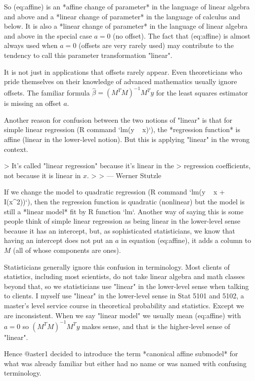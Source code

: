 \documentclass[11pt]{article}
\begin{document}
So \@ref(eq:affine) is an *affine change of parameter* in the language
of linear algebra and above and a *linear change of parameter* in the
language of calculus and below.  It is also a *linear change of parameter*
in the language of linear algebra and above in the special case $a = 0$
(no offset).  The fact that \@ref(eq:affine) is almost always used when $a = 0$
(offsets are very rarely used) may contribute to the tendency to
call this parameter transformation "linear".

It is not just in applications that offsets rarely appear.
Even theoreticians who pride themselves on their knowledge
of advanced mathematics usually ignore offsets.
The familiar formula $\hat{\beta} = (M^T M)^{- 1} M^T y$ for the
least squares estimator is missing an offset $a$.

Another reason for confusion between the two notions of "linear" is that
for simple linear regression (R command `lm(y ~ x)`), the *regression function*
is affine (linear in the lower-level notion).  But this is applying "linear"
in the wrong context.

> It's called "linear regression" because it's linear in the
> regression coefficients, not because it is linear in $x$.
>
> — Werner Stutzle

If we change the model to quadratic regression
(R command `lm(y ~ x + I(x^2))`), then the regression function is quadratic
(nonlinear) but the model is still a *linear model* fit by R function `lm`.
Another way of saying this is some people think of simple linear regression
as being linear in the lower-level sense because it has an intercept,
but, as sophisticated statisticians, we know that having an intercept
does not put an $a$ in equation \@ref(eq:affine), it adds a column to $M$
(all of whose components are ones).

Statisticians generally ignore this confusion in terminology.  Most clients
of statistics, including most scientists, do not take linear algebra
and math classes beyond that, so we statisticians use "linear"
in the lower-level sense when
talking to clients.  I myself use "linear" in the lower-level sense in Stat
5101 and 5102, a master's level service course in theoretical probability
and statistics.  Except we are inconsistent.  When we say "linear model"
we usually
mean \@ref(eq:affine) with $a = 0$ so $(M^T M)^{- 1} M^T y$ makes sense,
and that is the higher-level sense of "linear".

Hence @aster1 decided to introduce
the term *canonical affine submodel* for what was already familiar but
either had no name or was named with confusing terminology.
\end{document}
